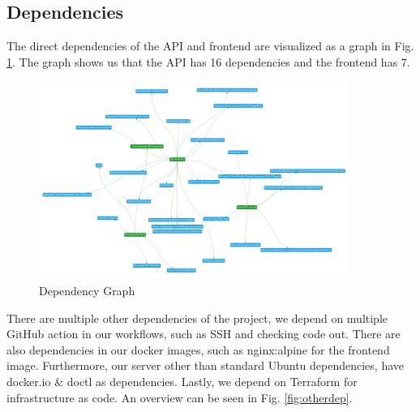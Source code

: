 \documentclass[10pt]{article}
\begin{document}
\subsection{Dependencies}
The direct dependencies of the API and frontend are visualized as a graph in Fig. \ref{fig:depgrapg}. The graph shows us that the API has 16 dependencies and the frontend has 7.
\begin{figure} [H]
  \centering
  \includegraphics[width=0.9\textwidth]{images/dependencygraph.png}
  \caption{Dependency Graph}
  \label{fig:depgrapg}
\end{figure}

There are multiple other dependencies of the project, we depend on multiple GitHub action in our workflows, such as SSH and checking code out. There are also dependencies in our docker images, such as nginx:alpine for the frontend image. Furthermore, our server other than standard Ubuntu dependencies, have docker.io \& doctl as dependencies. Lastly, we depend on Terraform for infrastructure as code. An overview can be seen in Fig. \ref{fig:otherdep}.
\end{document}
